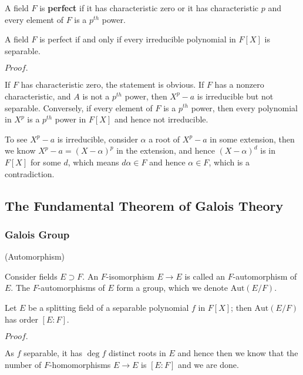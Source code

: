 \documentclass{article}
\newcommand{\Pf}[1]{$Proof.$\par}
\begin{document}
\begin{definition}
    A field $F$ is \textbf{perfect} if it has characteristic zero or it has characteristic $p$ and every element of $F$ is a $p^{th}$ power.
\end{definition}

\begin{proposition}
    A field $F$ is perfect if and only if every irreducible polynomial in $F[X]$ is separable.
\end{proposition}
\Pf\par
    If $F$ has characteristic zero, the statement is obvious. If $F$ has a nonzero characteristic, and $A$ is not a $p^{th}$ power, then $X^p - a$ is irreducible but not separable. Conversely, if every element of $F$ is a $p^{th}$ power, then every polynomial in $X^p$ is a $p^{th}$ power in $F[X]$ and hence not irreducible.\par
    To see $X^p - a$ is irreducible, consider $\alpha$ a root of $X^p - a$ in some extension, then we know $X^p - a = (X-\alpha)^p$ in the extension, and hence $(X-\alpha)^d$ is in $F[X]$ for some $d$, which means $d\alpha \in F$ and hence $\alpha \in F$, which is a contradiction.

\subsection{The Fundamental Theorem of Galois Theory}

\subsubsection{Galois Group}

\begin{definition}
    (Automorphism)\par
    Consider fields $E\supset F$. An $F$-isomorphism $E\to E$ is called an $F$-automorphism of $E$. The $F$-automorphisms of $E$ form a group, which we denote $\text{Aut}(E/F)$.
\end{definition}

\begin{proposition}
    Let $E$ be a splitting field of a separable polynomial $f$ in $F[X]$; then $\text{Aut}(E/F)$ has order $[E:F]$.
\end{proposition}
\Pf\par
    As $f$ separable, it has $\deg f$ distinct roots in $E$ and hence then we know that the number of $F$-homomorphisms $E\to E$ is $[E:F]$ and we are done.
\end{document}
